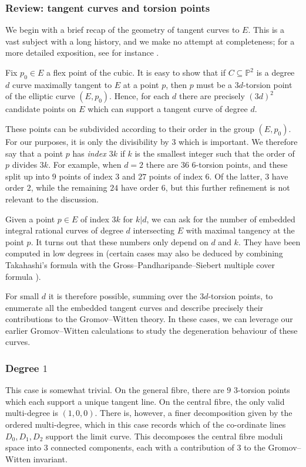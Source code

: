 \documentclass[11pt]{amsart}
\theoremstyle{definition}
\theoremstyle{definition}
\newcommand{\PP}{\mathbb{P}}
\begin{document}
\subsubsection{Review: tangent curves and torsion points} We begin with a brief recap of the geometry of tangent curves to $E$. This is a vast subject with a long history, and we make no attempt at completeness; for a more detailed exposition, see for instance \cite[\S 0]{BousseauTakahashi}.

Fix $p_0 \in E$ a flex point of the cubic. It is easy to show that if $C \subseteq \PP^2$ is a degree $d$ curve maximally tangent to $E$ at a point $p$, then $p$ must be a $3d$-torsion point of the elliptic curve $(E,p_0)$. Hence, for each $d$ there are precisely $(3d)^2$ candidate points on $E$ which can support a tangent curve of degree $d$.

These points can be subdivided according to their order in the group $(E,p_0)$. For our purposes, it is only the divisibility by $3$ which is important. We therefore say that a point $p$ has \emph{index $3k$} if $k$ is the smallest integer such that the order of $p$ divides $3k$. For example, when $d=2$ there are $36$ $6$-torsion points, and these split up into $9$ points of index $3$ and $27$ points of index $6$. Of the latter, $3$ have order $2$, while the remaining $24$ have order $6$, but this further refinement is not relevant to the discussion.

Given a point $p \in E$ of index $3k$ for $k|d$, we can ask for the number of embedded integral rational curves of degree $d$ intersecting $E$ with maximal tangency at the point $p$. It turns out that these numbers only depend on $d$ and $k$. They have been computed in low degrees in \cite{TakahashiCurvesComplement} (certain cases may also be deduced by combining Takahashi's formula \cite{BousseauTakahashi} with the Gross--Pandharipande--Siebert multiple cover formula \cite{GPS}).

For small $d$ it is therefore possible, summing over the $3d$-torsion points, to enumerate all the embedded tangent curves and describe precisely their contributions to the Gromov--Witten theory. In these cases, we can leverage our earlier Gromov--Witten calculations to study the degeneration behaviour of these curves.

\subsubsection{Degree $1$} This case is somewhat trivial. On the general fibre, there are $9$ $3$-torsion points which each support a unique tangent line. On the central fibre, the only valid multi-degree is $(1,0,0)$. There is, however, a finer decomposition given by the ordered multi-degree, which in this case records which of the co-ordinate lines $D_0,D_1,D_2$ support the limit curve. This decomposes the central fibre moduli space into $3$ connected components, each with a contribution of $3$ to the Gromov--Witten invariant.
\end{document}
